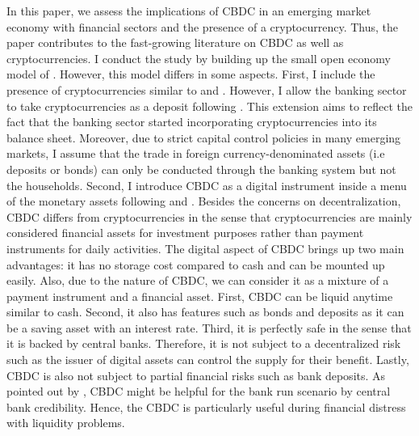 \documentclass[12pt, a4paper]{article}
\begin{document}
In this paper, we assess the implications of CBDC in an emerging market economy with financial sectors and the presence of a cryptocurrency. Thus, the paper contributes to the fast-growing literature on CBDC as well as cryptocurrencies. I conduct the study by building up the small open economy model of \cite{aoki2016monetary}. However, this model differs in some aspects. First, I include the presence of cryptocurrencies similar to \cite{sockin2018model} and \cite{asimakopoulos2019new}. However, I allow the banking sector to take cryptocurrencies as a deposit following \cite{murakami2021cryptocurrencies}. This extension aims to reflect the fact that the banking sector started incorporating cryptocurrencies into its balance sheet. Moreover, due to strict capital control policies in many emerging markets, I assume that the trade in foreign currency-denominated assets (i.e deposits or bonds) can only be conducted through the banking system but not the households. Second, I introduce CBDC as a digital instrument inside a menu of the monetary assets following \cite{agur2022designing} and \cite{minesso2022central}. Besides the concerns on decentralization, CBDC differs from cryptocurrencies in the sense that cryptocurrencies are mainly considered financial assets for investment purposes rather than payment instruments for daily activities. The digital aspect of CBDC brings up two main advantages: it has no storage cost compared to cash and can be mounted up easily. Also, due to the nature of CBDC, we can consider it as a mixture of a payment instrument and a financial asset. First, CBDC can be liquid anytime similar to cash. Second, it also has features such as bonds and deposits as it can be a saving asset with an interest rate. Third, it is perfectly safe in the sense that it is backed by central banks. Therefore, it is not subject to a decentralized risk such as the issuer of digital assets can control the supply for their benefit. Lastly, CBDC is also not subject to partial financial risks such as bank deposits. As pointed out by \cite{keister2020discussion}, CBDC might be helpful for the bank run scenario by central bank credibility. Hence, the CBDC is particularly useful during financial distress with liquidity problems.

\end{document}
